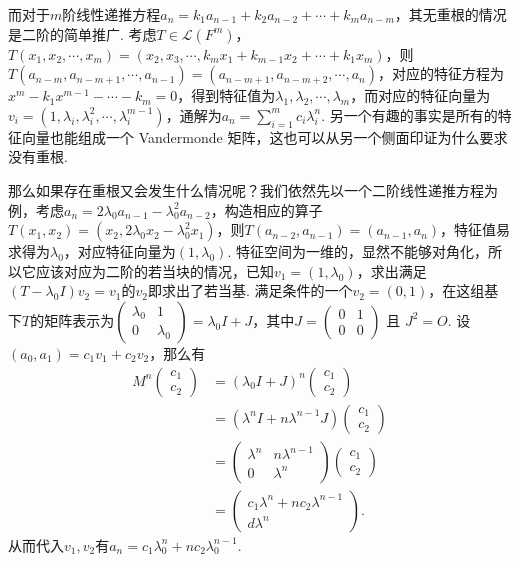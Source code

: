 而对于$m$阶线性递推方程$a_n = k_1 a_{n - 1} + k_2 a_{n - 2} + \cdots + k_m a_{n - m}$，其无重根的情况是二阶的简单推广. 考虑$T \in \mathcal{L}(F^m)$，$T(x_1, x_2, \cdots, x_m) = (x_2, x_3, \cdots, k_m x_1 + k_{m - 1} x_2 + \cdots + k_1 x_m)$，则$T(a_{n - m}, a_{n - m + 1}, \cdots, a_{n - 1}) = (a_{n - m + 1}, a_{n - m + 2}, \cdots, a_n)$，对应的特征方程为$x^m - k_1 x^{m - 1} - \cdots - k_m = 0$，得到特征值为$\lambda_1, \lambda_2, \cdots, \lambda_m$，而对应的特征向量为$v_i = (1, \lambda_i, \lambda_i^2, \cdots, \lambda_i^{m - 1})$，通解为$a_n = \sum_{i = 1}^m c_i \lambda_i^n$. 另一个有趣的事实是所有的特征向量也能组成一个 Vandermonde 矩阵，这也可以从另一个侧面印证为什么要求没有重根.

那么如果存在重根又会发生什么情况呢？我们依然先以一个二阶线性递推方程为例，考虑$a_n = 2 \lambda_0 a_{n - 1} - \lambda_0^2 a_{n - 2}$，构造相应的算子$T(x_1, x_2) = (x_2, 2 \lambda_0 x_2 - \lambda_0^2 x_1)$，则$T(a_{n - 2}, a_{n - 1}) = (a_{n - 1}, a_n)$，特征值易求得为$\lambda_0$，对应特征向量为$(1, \lambda_0)$. 特征空间为一维的，显然不能够对角化，所以它应该对应为二阶的若当块的情况，已知$v_1 = (1, \lambda_0)$，求出满足$(T - \lambda_0 I)v_2 = v_1$的$v_2$即求出了若当基. 满足条件的一个$v_2 = (0, 1)$，在这组基下$T$的矩阵表示为$\begin{pmatrix} \lambda_0 & 1 \\ 0 & \lambda_0 \end{pmatrix} = \lambda_0 I + J$，其中$J = \begin{pmatrix} 0 & 1 \\ 0 & 0 \end{pmatrix}$ 且 $J^2 = O$. 设$(a_0, a_1) = c_1v_1 + c_2v_2$，那么有
\begin{align*}
    M^n \begin{pmatrix} c_1 \\ c_2 \end{pmatrix} & = (\lambda_0 I + J)^n \begin{pmatrix} c_1 \\ c_2 \end{pmatrix} \\
    & = (\lambda^n I + n \lambda^{n - 1} J) \begin{pmatrix} c_1 \\ c_2 \end{pmatrix} \\
    & = \begin{pmatrix} \lambda^n & n \lambda^{n - 1} \\ 0 & \lambda^n \end{pmatrix} \begin{pmatrix} c_1 \\ c_2 \end{pmatrix} \\
    & = \begin{pmatrix} c_1 \lambda^n + n c_2 \lambda^{n - 1} \\ d \lambda^n \end{pmatrix}.
\end{align*}
从而代入$v_1, v_2$有$a_n = c_1 \lambda_0^n + n c_2 \lambda_0^{n - 1}$.

